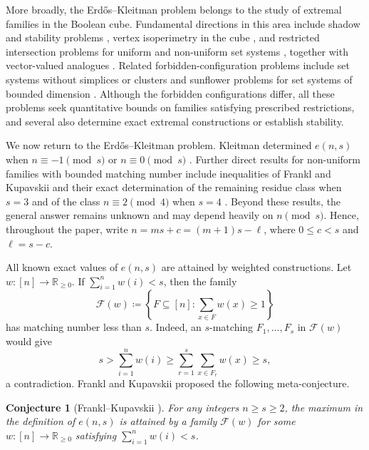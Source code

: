 \documentclass[10pt,a4paper]{article}
\numberwithin{equation}{section}
\newtheorem{conjecture}[conjecture]{Conjecture}
\theoremstyle{definition}
\begin{document}
More broadly, the Erd\H{o}s--Kleitman problem belongs to the study of extremal families in the Boolean cube.
Fundamental directions in this area include shadow and stability problems \cite{KeevashShadows}, vertex isoperimetry in the cube \cite{KeevashLongCube}, and restricted intersection problems for uniform and non-uniform set systems \cite{AnsteeKeevash,KeevashSudakovCross}, together with vector-valued analogues \cite{KeevashLongIntersections}.
Related forbidden-configuration problems include set systems without simplices or clusters \cite{KeevashMubayiSimplex} and sunflower problems for set systems of bounded dimension \cite{FoxPachSukSunflowers}.
Although the forbidden configurations differ, all these problems seek quantitative bounds on families satisfying prescribed restrictions, and several also determine exact extremal constructions or establish stability.

We now return to the Erd\H{o}s--Kleitman problem.
Kleitman determined $e(n,s)$ when $n\equiv-1\pmod s$ or $n\equiv0\pmod s$ \cite{Kleitman}.
Further direct results for non-uniform families with bounded matching number include inequalities of Frankl and Kupavskii \cite{FranklKupavskiiInequalities} and their exact determination of the remaining residue class when $s=3$ and of the class $n\equiv2\pmod4$ when $s=4$ \cite{FranklKupavskiiSmallMatchings}.
Beyond these results, the general answer remains unknown and may depend heavily on $n\pmod s$.
Hence, throughout the paper, write $n=ms+c=(m+1)s-\ell$, where $0\le c<s$ and $\ell=s-c$.

All known exact values of $e(n,s)$ are attained by weighted constructions.
Let $w\colon [n]\to\mathbb R_{\ge0}$.
If $\sum_{i=1}^n w(i)<s$, then the family
\[
        \mathcal F(w)\coloneqq
        \left\{F\subseteq[n]\colon\sum_{x\in F}w(x)\ge1\right\}
\]
has matching number less than $s$.
Indeed, an $s$-matching $F_1,\ldots,F_s$ in $\mathcal F(w)$ would give
\[
        s>\sum_{i=1}^n w(i)\ge\sum_{r=1}^s\sum_{x\in F_r}w(x)\ge s,
\]
a contradiction.
Frankl and Kupavskii \cite{FKnonuniform} proposed the following meta-conjecture.

\begin{conjecture}[Frankl--Kupavskii \cite{FKnonuniform}]\label{conj:FK-meta}
        For any integers $n\ge s\ge2$, the maximum in the definition of $e(n,s)$ is attained by a family $\mathcal F(w)$ for some $w\colon [n]\to\mathbb R_{\ge0}$ satisfying $\sum_{i=1}^n w(i)<s$.
\end{conjecture}
\end{document}
